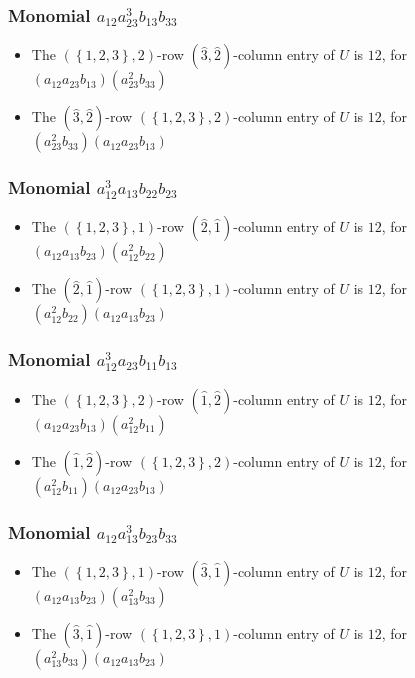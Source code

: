 \documentclass{article}
\begin{document}
\subsubsection{Monomial $ a_{12} a_{23}^{3} b_{13} b_{33} $}

\begin{itemize}
\item The $ \left(\left\{1, 2, 3\right\}, 2\right) $-row $ (\hat{3}, \hat{2}) $-column entry of $U$ is $ 12 $, for $( a_{12} a_{23} b_{13} )( a_{23}^{2} b_{33} )$ 
\item The $(\hat{3}, \hat{2})$-row $ \left(\left\{1, 2, 3\right\}, 2\right) $-column entry of $U$ is $ 12 $, for $( a_{23}^{2} b_{33} )( a_{12} a_{23} b_{13} )$ 
\end{itemize}
\subsubsection{Monomial $ a_{12}^{3} a_{13} b_{22} b_{23} $}

\begin{itemize}
\item The $ \left(\left\{1, 2, 3\right\}, 1\right) $-row $ (\hat{2}, \hat{1}) $-column entry of $U$ is $ 12 $, for $( a_{12} a_{13} b_{23} )( a_{12}^{2} b_{22} )$ 
\item The $(\hat{2}, \hat{1})$-row $ \left(\left\{1, 2, 3\right\}, 1\right) $-column entry of $U$ is $ 12 $, for $( a_{12}^{2} b_{22} )( a_{12} a_{13} b_{23} )$ 
\end{itemize}
\subsubsection{Monomial $ a_{12}^{3} a_{23} b_{11} b_{13} $}

\begin{itemize}
\item The $ \left(\left\{1, 2, 3\right\}, 2\right) $-row $ (\hat{1}, \hat{2}) $-column entry of $U$ is $ 12 $, for $( a_{12} a_{23} b_{13} )( a_{12}^{2} b_{11} )$ 
\item The $(\hat{1}, \hat{2})$-row $ \left(\left\{1, 2, 3\right\}, 2\right) $-column entry of $U$ is $ 12 $, for $( a_{12}^{2} b_{11} )( a_{12} a_{23} b_{13} )$ 
\end{itemize}
\subsubsection{Monomial $ a_{12} a_{13}^{3} b_{23} b_{33} $}

\begin{itemize}
\item The $ \left(\left\{1, 2, 3\right\}, 1\right) $-row $ (\hat{3}, \hat{1}) $-column entry of $U$ is $ 12 $, for $( a_{12} a_{13} b_{23} )( a_{13}^{2} b_{33} )$ 
\item The $(\hat{3}, \hat{1})$-row $ \left(\left\{1, 2, 3\right\}, 1\right) $-column entry of $U$ is $ 12 $, for $( a_{13}^{2} b_{33} )( a_{12} a_{13} b_{23} )$ 
\end{itemize}
\end{document}
